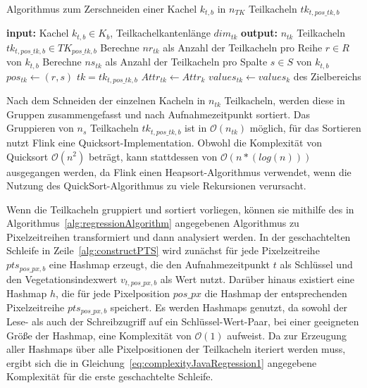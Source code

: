 \begin{algorithm}[H]
\small
\caption{Algorithmus zum Zerschneiden einer Kachel $k_{t, b}$ in $n_{TK}$ Teilkacheln $tk_{t, pos\_tk, b}$}
\label{alg:cutAlgorithm}
\begin{algorithmic}[1]
	\State \textbf{input:} Kachel $k_{t, b} \in K_{b}$, Teilkachelkantenlänge $dim_{tk}$ 
	\State \textbf{output:} $n_{tk}$ Teilkacheln $tk_{t, pos\_tk, b} \in TK_{pos\_tk, b}$
	\State Berechne $nr_{tk}$ als Anzahl der Teilkacheln pro Reihe $r \in R$ von $k_{t, b}$  \label{alg:calcNR}
	\State Berechne $ns_{tk}$ als Anzahl der Teilkacheln pro Spalte $s \in S$ von $k_{t, b}$  \label{alg:calcNS}
	  \label{alg:iterR}
        		  \label{alg:iterS}
			\State $pos_{tk} \leftarrow (r, s)$  \label{alg:setAttributes}
			\State $tk = tk_{t, pos\_tk, b}$ 
        			\State $Attr_{tk} \leftarrow Attr_{k}$ 
			   \label{alg:computeS16}
				\State $values_{tk} \leftarrow values_k$ des Zielbereichs 
			\EndFor
		\EndFor
		 
	\EndFor
\EndFunction
\end{algorithmic}
\end{algorithm}

Nach dem Schneiden der einzelnen Kacheln in $n_{tk}$ Teilkacheln, werden diese in Gruppen zusammengefasst und nach Aufnahmezeitpunkt sortiert. Das Gruppieren von $n_{s}$ Teilkacheln $tk_{t, pos\_tk, b}$ ist in $\mathcal{O}(n_{tk})$ möglich, für das Sortieren nutzt Flink eine Quicksort-Implementation. Obwohl die Komplexität von Quicksort $\mathcal{O}(n^2)$ beträgt, kann stattdessen von $\mathcal{O}(n*(log(n)))$ ausgegangen werden, da Flink einen Heapsort-Algorithmus verwendet, wenn die Nutzung des QuickSort-Algorithmus zu viele Rekursionen verursacht. 

Wenn die Teilkacheln gruppiert und sortiert vorliegen, können sie mithilfe des in Algorithmus~\ref{alg:regressionAlgorithm} angegebenen Algorithmus zu Pixelzeitreihen transformiert und dann analysiert werden. In der geschachtelten Schleife in Zeile~\ref{alg:constructPTS} wird zunächst für jede Pixelzeitreihe $pts_{pos\_px, b}$ eine Hashmap erzeugt, die den Aufnahmezeitpunkt $t$ als Schlüssel und den Vegetationsindexwert $v_{t, pos\_px, b}$ als Wert nutzt. Darüber hinaus existiert eine Hashmap $h$, die für jede Pixelposition $pos\_px$ die Hashmap der entsprechenden Pixelzeitreihe $pts_{pos\_px, b}$ speichert. Es werden Hashmaps genutzt, da sowohl der Lese- als auch der Schreibzugriff auf ein Schlüssel-Wert-Paar, bei einer geeigneten Größe der Hashmap, eine Komplexität von $\mathcal{O}(1)$ aufweist. Da zur Erzeugung aller Hashmaps über alle Pixelpositionen der Teilkacheln iteriert werden muss, ergibt sich die in Gleichung~\ref{eq:complexityJavaRegression1} angegebene Komplexität für die erste geschachtelte Schleife. 

